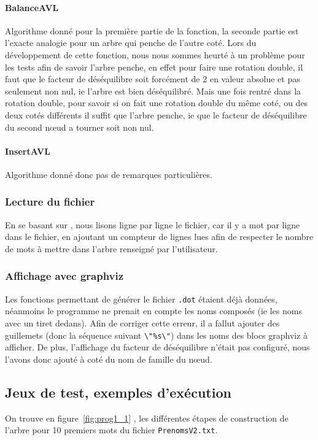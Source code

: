 \documentclass{article} %
\begin{document}
\paragraph{BalanceAVL} Algorithme donné pour la première partie de la fonction, la seconde partie est l'exacte analogie pour un arbre qui penche de l'autre coté. Lors du développement de cette fonction, nous nous sommes heurté à un problème pour les tests afin de savoir l'arbre penche, en effet pour faire une rotation double, il faut que le facteur de déséquilibre soit forcément de 2 en valeur absolue et pas seulement non nul, ie l'arbre est bien déséquilibré. Mais une fois rentré dans la rotation double, pour savoir si on fait une rotation double du même coté, ou des deux cotés différents il suffit que l'arbre penche, ie que le facteur de déséquilibre du second nœud a tourner soit non nul. 


\paragraph{InsertAVL} Algorithme donné donc pas de remarques particulières.

\subsubsection{Lecture du fichier}
En se basant sur \cite{lect_lines}, nous lisons ligne par ligne le fichier, car il y a mot par ligne dans le fichier, en ajoutant un compteur de lignes lues afin de respecter le nombre de mots à mettre dans l'arbre renseigné par l'utilisateur.  

\subsubsection{Affichage avec graphviz}
Les fonctions permettant de générer le fichier \texttt{.dot} étaient déjà données, néanmoins le programme ne prenait en compte les noms composés (ie les noms avec un tiret dedans). Afin de corriger cette erreur, il a fallut ajouter des guillemets (donc la séquence suivant \texttt{\textbackslash "\%s\textbackslash "}) dans les noms des blocs graphviz à afficher. De plus, l'affichage du facteur de déséquilibre n'était pas configuré, nous l'avons donc ajouté à coté du nom de famille du nœud.


\subsection{Jeux de test, exemples d'exécution}
On trouve en figure~\ref{fig:prog1_1} , les différentes étapes de construction de l'arbre pour 10 premiers mots du fichier \texttt{PrenomsV2.txt}. 
\end{document}
